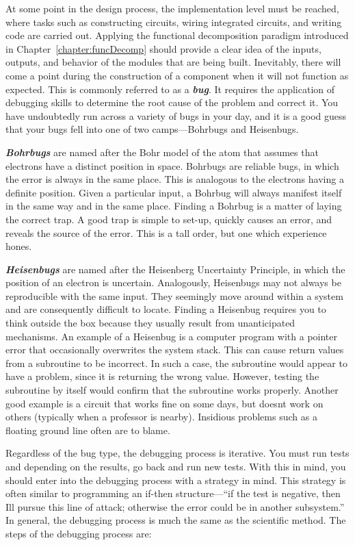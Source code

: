 At some point in the design process, the implementation level must be
reached, where tasks such as constructing circuits, wiring integrated
circuits, and writing code are carried out. Applying the functional
decomposition paradigm introduced in Chapter~\ref{chapter:funcDecomp} 
should provide a clear
idea of the inputs, outputs, and behavior of the modules that are being
built. Inevitably, there will come a point during the construction of a
component when it will not function as expected. This is commonly
referred to as a \emph{\textbf{bug}}. It requires the application of
debugging skills to determine the root cause of the problem and correct
it. You have undoubtedly run across a variety of bugs in your day, and
it is a good guess that your bugs fell into one of two camps---Bohrbugs
and Heisenbugs.

\emph{\textbf{Bohrbugs}} are named after the Bohr model of the atom that
assumes that electrons have a distinct position in space. Bohrbugs are
reliable bugs, in which the error is always in the same place. This is
analogous to the electrons having a definite position. Given a
particular input, a Bohrbug will always manifest itself in the same way
and in the same place. Finding a Bohrbug is a matter of laying the
correct trap. A good trap is simple to set-up, quickly causes an error,
and reveals the source of the error. This is a tall order, but one which
experience hones.

\emph{\textbf{Heisenbugs}} are named after the Heisenberg Uncertainty
Principle, in which the position of an electron is uncertain.
Analogously, Heisenbugs may not always be reproducible with the same
input. They seemingly move around within a system and are consequently
difficult to locate. Finding a Heisenbug requires you to think outside
the box because they usually result from unanticipated mechanisms. An
example of a Heisenbug is a computer program with a pointer error that
occasionally overwrites the system stack. This can cause return values
from a subroutine to be incorrect. In such a case, the subroutine would
appear to have a problem, since it is returning the wrong value.
However, testing the subroutine by itself would confirm that the
subroutine works properly. Another good example is a circuit that works
fine on some days, but doesn\textquotesingle t work on others (typically
when a professor is nearby). Insidious problems such as a floating
ground line often are to blame.

Regardless of the bug type, the debugging process is iterative. You must
run tests and depending on the results, go back and run new tests. With
this in mind, you should enter into the debugging process with a
strategy in mind. This strategy is often similar to programming an
if-then structure---``if the test is negative, then I\textquotesingle ll
pursue this line of attack; otherwise the error could be in another
subsystem.'' In general, the debugging process is much the same as the
scientific method. The steps of the debugging process are:

